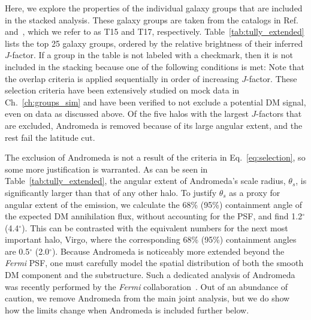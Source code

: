   Here, we explore the properties of the individual galaxy groups that are included in the stacked analysis.  These galaxy groups are taken from the catalogs in Ref.~\cite{Tully:2015opa} and~\cite{2017ApJ...843...16K}, which we refer to as T15 and T17, respectively.  Table~\ref{tab:tully_extended} lists the top 25 galaxy groups, ordered by the relative brightness of their inferred $J$-factor.  If a group in the table is not labeled with a checkmark, then it is not included in the stacking because one of the following conditions is met:
Note that the overlap criteria is applied sequentially in order of increasing $J$-factor.
These selection criteria have been extensively studied on mock data in Ch.~\ref{ch:groups_sim} and have been verified to not exclude a potential DM signal, even on data as discussed above. Of the five halos with the largest $J$-factors that are excluded, Andromeda is removed because of its large angular extent, and the rest fail the latitude cut. 

The exclusion of Andromeda is not a result of the criteria in Eq.~\ref{eq:selection}, so some more justification is warranted. As can be seen in Table~\ref{tab:tully_extended}, the angular extent of Andromeda's  scale radius, $\theta_{s}$, is significantly larger than that of any other halo.  To justify $\theta_{s}$ as a proxy for angular extent of the emission, we calculate the 68\% (95\%) containment angle of the expected DM annihilation flux, without accounting for the PSF, and find 1.2$^{\circ}$ (4.4$^{\circ}$). This can be contrasted with the equivalent numbers for the next most important halo, Virgo, where the corresponding  68\% (95\%) containment angles are 0.5$^{\circ}$ (2.0$^{\circ}$). 
Because Andromeda is noticeably more extended beyond the \textit{Fermi} PSF, one must carefully model the spatial distribution of both the smooth DM component and the substructure.  Such a dedicated analysis of Andromeda was recently performed by the \emph{Fermi} collaboration~\cite{Ackermann:2017nya}.  Out of an abundance of caution, we remove Andromeda from the main joint analysis, but we do show how the limits change when Andromeda is included further below.

